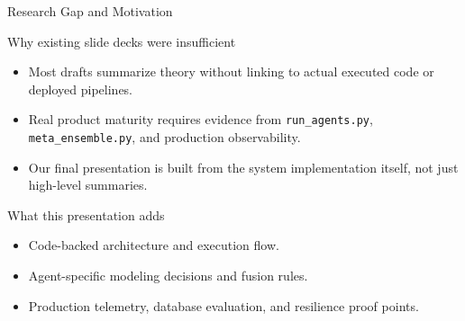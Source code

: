 \documentclass{beamer}
\begin{document}
\begin{frame}{Research Gap and Motivation}
\begin{alertcard}{Why existing slide decks were insufficient}
  \begin{itemize}
    \item Most drafts summarize theory without linking to actual executed code or deployed pipelines.
    \item Real product maturity requires evidence from \texttt{run\_agents.py}, \texttt{meta\_ensemble.py}, and production observability.
    \item Our final presentation is built from the system implementation itself, not just high-level summaries.
  \end{itemize}
\end{alertcard}

\vspace{6pt}
\begin{successcard}{What this presentation adds}
  \begin{itemize}
    \item Code-backed architecture and execution flow.
    \item Agent-specific modeling decisions and fusion rules.
    \item Production telemetry, database evaluation, and resilience proof points.
  \end{itemize}
\end{successcard}
\end{frame}
\end{document}
